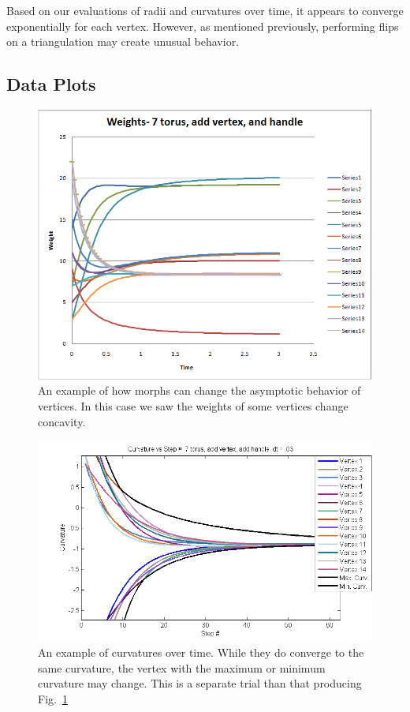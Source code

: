 \documentclass[12pt]{article}
\begin{document}
Based on our evaluations of radii and curvatures over time, it appears to converge exponentially for each vertex. However, as mentioned previously, performing flips on a triangulation may create unusual behavior.

\subsection{Data Plots}
\label{dataplots}

\begin{figure}[ht]
\centering
\includegraphics[scale = 0.65]{Pictures3/torus7addvaddhweights2.png}
\caption{An example of how morphs can change the asymptotic behavior of vertices. In this case we saw the weights of some vertices change concavity.}
\label{fig:t7vh}
\end{figure}

\begin{figure}
\centering
\includegraphics[scale = 0.8]{Pictures3/curvcurves.png}
\caption{An example of curvatures over time. While they do converge to the same curvature, the vertex with the maximum or minimum curvature may change. This is a separate trial than that producing Fig.~\ref{fig:t7vh}}
\end{figure}
\end{document}
